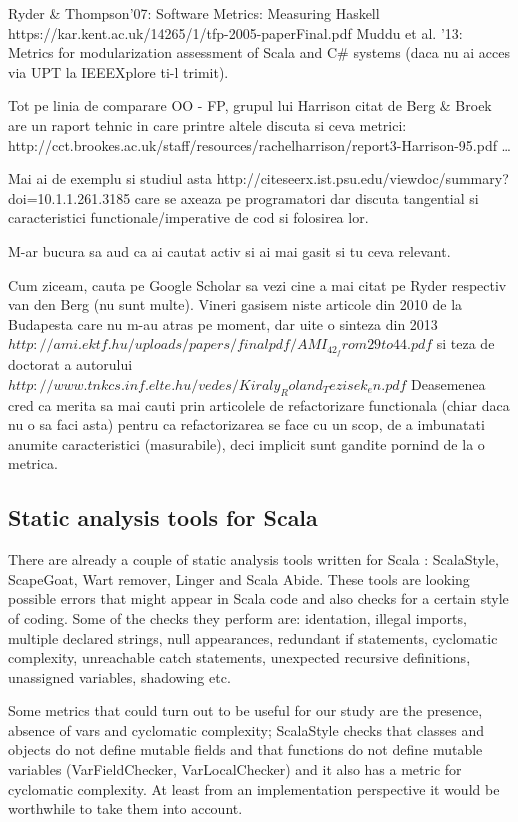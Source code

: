 \documentclass{article}
\begin{document}
Ryder \& Thompson'07: Software Metrics: Measuring Haskell https://kar.kent.ac.uk/14265/1/tfp-2005-paperFinal.pdf
Muddu et al. '13: Metrics for modularization assessment of Scala and C\# systems
(daca nu ai acces via UPT la IEEEXplore ti-l trimit).

Tot pe linia de comparare OO - FP, grupul lui Harrison citat de
Berg \& Broek are un raport tehnic in care printre altele discuta
si ceva metrici:
        http://cct.brookes.ac.uk/staff/resources/rachelharrison/report3-Harrison-95.pdf
…

Mai ai de exemplu si studiul asta
        http://citeseerx.ist.psu.edu/viewdoc/summary?doi=10.1.1.261.3185
care se axeaza pe programatori dar discuta tangential si caracteristici
functionale/imperative de cod si folosirea lor.

M-ar bucura sa aud ca ai cautat activ si ai mai gasit si tu ceva relevant.


Cum ziceam, cauta pe Google Scholar sa vezi cine a mai citat pe
Ryder respectiv van den Berg (nu sunt multe). Vineri gasisem niste
articole din 2010 de la Budapesta care nu m-au atras pe moment,
dar uite o sinteza din 2013
        $http://ami.ektf.hu/uploads/papers/finalpdf/AMI_42_from29to44.pdf$
si teza de doctorat a autorului
$        http://www.tnkcs.inf.elte.hu/vedes/Kiraly_Roland_Tezisek_en.pdf$
Deasemenea cred ca merita sa mai cauti prin articolele de refactorizare
functionala (chiar daca nu o sa faci asta) pentru ca refactorizarea
se face cu un scop, de a imbunatati anumite caracteristici (masurabile),
deci implicit sunt gandite pornind de la o metrica.

\subsection {Static analysis tools for Scala}
There are already a couple of static analysis tools written for Scala : ScalaStyle, ScapeGoat, Wart remover, Linger and Scala Abide. These tools are looking possible errors that might appear in Scala code and also checks for a certain style of coding. Some of the checks they perform are: identation, illegal imports, multiple declared strings, null appearances, redundant if statements, cyclomatic complexity, unreachable catch statements, unexpected recursive definitions, unassigned variables, shadowing etc. \par

Some metrics that could turn out to be useful for our study are  the presence, absence of vars and cyclomatic complexity; ScalaStyle checks that classes and objects do not define mutable fields and that functions do not define mutable variables (VarFieldChecker, VarLocalChecker) \cite{scalastyle} and it also has a metric for cyclomatic complexity. At least from an implementation perspective it would be worthwhile to take them into account.\par
\end{document}
